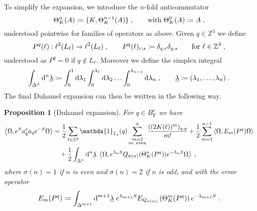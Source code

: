 \documentclass[12pt,a4paper]{article}
\numberwithin{equation}{section}
\newcommand{\Zbb}{\mathbb{Z}}
\newcommand{\ulambda}{\underline{\lambda}}
\newcommand{\1}{\mathbb{I}}
\newcommand{\di}{\textnormal{d}}
\newcommand{\F}{\mathrm{F}}
\newcommand{\Zstar}{\mathbb{Z}^3} %
\newcommand{\Z}{\mathbb{Z}}
\newcommand{\half}{\frac{1}{2}}
\newcommand{\eva}[1]{\left\langle #1 \right\rangle}
\theoremstyle{plain}
\newtheorem{proposition}[theorem]{Proposition}
\theoremstyle{definition}
\theoremstyle{remark}
\theoremstyle{plain}
\theoremstyle{definition}
\theoremstyle{remark}
\begin{document}
To simplify the expansion, we introduce the $n$-fold anticommutator
\begin{equation} \label{eq:Theta}
	\Theta_K^n (A)
	\coloneq \{ K, \Theta_K^{n-1} (A) \} \;, \qquad
	\textnormal{with }
	\Theta_K^0 (A)
	\coloneq A \;,
\end{equation}
understood pointwise for families of operators as above.
Given $q \in \Zbb^3$ we define
\begin{equation} \label{eq:Pq}
	P^q(\ell) : \ell^2(L_\ell) \to \ell^2(L_\ell) \;, \qquad
	P^q(\ell)_{r,s} \coloneq \delta_{q,r} \delta_{q,s} \qquad
	\textnormal{for } \ell \in \Zstar \;,
\end{equation}
understood as $ P^q = 0 $ if $ q \notin L_\ell $.
Moreover we define the simplex integral
\begin{equation} \label{eq:Deltan}
	\int_{\Delta^n} \di^n \ulambda
	\coloneq \int_0^1 \di \lambda_1 \int_0^{\lambda_1} \di \lambda_2 \ldots \int_0^{\lambda_{n-1}} \di \lambda_n \;, \qquad
	\ulambda \coloneq (\lambda_1, \ldots, \lambda_n) \;.
\end{equation}
 The final Duhamel expansion can then be written in the following way.

\begin{proposition}[Duhamel expansion]\label{prop:finexpan}
For $q \in B^c_{\F}$ we have
\begin{align} \label{eq:finexpan}
	\eva{\Omega, e^{S} a_q^* a_q e^{-S} \Omega} 
	&= \half\sum_{\ell\in \Zstar}\mathds{1}_{L_\ell}(q) \sum_{\substack{m=2\\m:\textnormal{ even}}}^n \frac{((2K(\ell))^m)_{q,q}}{m!}
		+ \half \sum_{m=1}^{n-1} \eva{\Omega, E_m(P^q)\Omega}\nonumber\\
	&\quad +\half \int_{\Delta^n} \di^n\underline{\lambda} \;
		\eva{\Omega, e^{\lambda_n S}Q_{\sigma(n)}(\Theta^n_{K}(P^q)) e^{-\lambda_n S} \Omega} \;,
\end{align}
where $ \sigma(n) = 1 $ if $n$ is even and $ \sigma(n) = 2 $ if $n$ is odd, and with the error operator
\begin{equation}\label{eq:errEm}
	E_m(P^q) \coloneq \int_{\Delta^{m+1}} \di^{m+1} \underline{\lambda} \;
		e^{\lambda_{m+1} S} E_{Q_{\sigma(m)}}\left(\Theta^{m}_{K}(P^q)\right) e^{-\lambda_{m+1} S} \;.
\end{equation}
\end{proposition}
\end{document}
